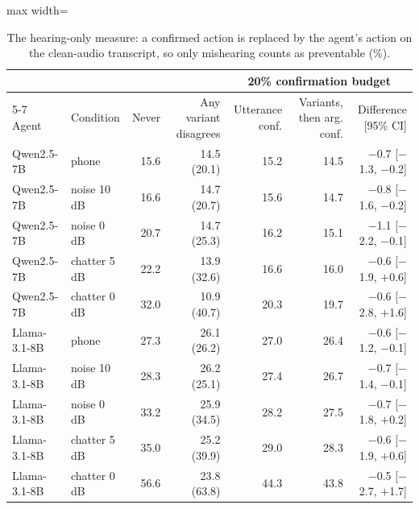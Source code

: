 \begin{table}[t]\centering\small
\begin{adjustbox}{max width=\linewidth}\begin{tabular}{llrrrrr}\toprule
 & & & & \multicolumn{3}{c}{20\% confirmation budget} \\ \cmidrule(lr){5-7}
Agent & Condition & Never & Any variant disagrees & Utterance conf. & Variants, then arg. conf. & Difference [95\% CI] \\ \midrule
Qwen2.5-7B & phone & 15.6 & 14.5 (20.1) & 15.2 & 14.5 & $-$0.7 [$-$1.3, $-$0.2] \\
Qwen2.5-7B & noise 10 dB & 16.6 & 14.7 (20.7) & 15.6 & 14.7 & $-$0.8 [$-$1.6, $-$0.2] \\
Qwen2.5-7B & noise 0 dB & 20.7 & 14.7 (25.3) & 16.2 & 15.1 & $-$1.1 [$-$2.2, $-$0.1] \\
Qwen2.5-7B & chatter 5 dB & 22.2 & 13.9 (32.6) & 16.6 & 16.0 & $-$0.6 [$-$1.9, $+$0.6] \\
Qwen2.5-7B & chatter 0 dB & 32.0 & 10.9 (40.7) & 20.3 & 19.7 & $-$0.6 [$-$2.8, $+$1.6] \\
\midrule
Llama-3.1-8B & phone & 27.3 & 26.1 (26.2) & 27.0 & 26.4 & $-$0.6 [$-$1.2, $-$0.1] \\
Llama-3.1-8B & noise 10 dB & 28.3 & 26.2 (25.1) & 27.4 & 26.7 & $-$0.7 [$-$1.4, $-$0.1] \\
Llama-3.1-8B & noise 0 dB & 33.2 & 25.9 (34.5) & 28.2 & 27.5 & $-$0.7 [$-$1.8, $+$0.2] \\
Llama-3.1-8B & chatter 5 dB & 35.0 & 25.2 (39.9) & 29.0 & 28.3 & $-$0.6 [$-$1.9, $+$0.6] \\
Llama-3.1-8B & chatter 0 dB & 56.6 & 23.8 (63.8) & 44.3 & 43.8 & $-$0.5 [$-$2.7, $+$1.7] \\
\bottomrule\end{tabular}\end{adjustbox}
\caption{The hearing-only measure: a confirmed action is replaced by the agent's action on the clean-audio transcript, so only mishearing counts as preventable (\%).}\label{tab:hearing}
\end{table}
